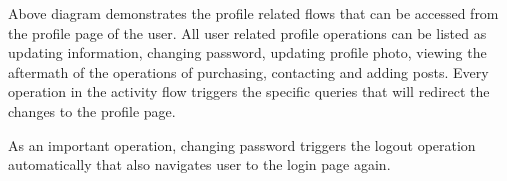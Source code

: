 Above diagram demonstrates the profile related flows that can be accessed from the profile page of the user. All user related profile operations can be listed as updating information, changing password, updating profile photo, viewing the aftermath of the operations of purchasing, contacting and adding posts. Every operation in the activity flow triggers the specific queries that will redirect the changes to the profile page. \newline

As an important operation, changing password triggers the logout operation automatically that also navigates user to the login page again. \newline


